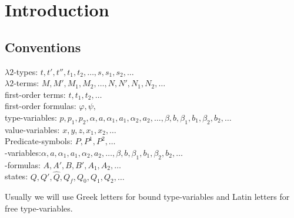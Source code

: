\section{Introduction}

\subsection{Conventions}
$\lambda2$-types: $t, t', t'', t_1, t_2, \dots,s,s_1,s_2,\dots$\\
$\lambda2$-terms: $M, M', M_1, M_2,\dots, N, N', N_1, N_2, \dots$\\
first-order terms: $t,t_1, t_2,\dots$\\
first-order formulas: $\varphi,\psi,$\\
type-variables: $p,p_1,p_2,\alpha, a,\alpha_1, a_1,\alpha_2,a_2, \dots, \beta, b,\beta_1,b_1,\beta_2,b_2, \dots$\\
value-variables: $x,y,z, x_1 , x_2 ,\dots$\\
Predicate-symbols: $P,P^1,P^2,\dots$\\
\SysP-variables:$\alpha, a,\alpha_1, a_1,\alpha_2,a_2, \dots, \beta, b,\beta_1,b_1,\beta_2,b_2, \dots$\\
\SysP-formulas: $A,A' ,B,B',A_1,A_2,\dots$\\
states: $Q,Q',\widehat{Q},Q_f,Q_0,Q_1,Q_2,\dots$

Usually we will use Greek letters for bound type-variables and Latin letters for free type-variables.